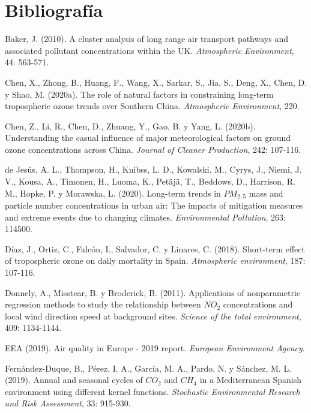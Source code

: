 \documentclass[12pt]{article}
\begin{document}
\section{Bibliografía}

\begin{thebibliography}{99}

 Baker, J. (2010). A cluster analysis of long range air transport pathways and associated pollutant concentrations within the UK. \textit{Atmospheric Environment}, 44: 563-571.

 Chen, X., Zhong, B., Huang, F., Wang, X., Sarkar, S., Jia, S., Deng, X., Chen, D. y Shao, M. (2020a). The role of natural factors in constraining long-term tropospheric ozone trends over Southern China. \textit{Atmospheric Environment}, 220.

 Chen, Z., Li, R., Chen, D., Zhuang, Y., Gao, B. y Yang, L. (2020b). Understanding the casual influence of major meteorological factors on ground ozone concentrations across China. \textit{Journal of Cleaner Production}, 242: 107-116.

 de Jesús, A. L., Thompson, H., Knibss, L. D., Kowalski, M., Cyrys, J., Niemi, J. V., Kousa, A., Timonen, H., Luoma, K., Petäjä, T., Beddows, D., Harrison, R. M., Hopke, P. y Morawska, L. (2020). Long-term trends in $PM_{2,5}$ mass and particle number concentrations in urban air: The impacts of mitigation measures and extreme events due to changing climates. \textit{Environmental Pollution}, 263: 114500.

 Díaz, J., Ortiz, C., Falcón, I., Salvador, C. y Linares, C. (2018). Short-term effect of tropospheric ozone on daily mortality in Spain. \textit{Atmospheric environment}, 187: 107-116.

 Donnely, A., Misstear, B. y Broderick, B. (2011). Applications of nonparametric regression methods to study the relationship between $NO_{2}$ concentrations and local wind direction speed at background sites. \textit{Science of the total environment}, 409: 1134-1144.

 EEA (2019). Air quality in Europe - 2019 report. \textit{European Environment Agency}.

 Fernández-Duque, B., Pérez, I. A., García, M. A., Pardo, N. y Sánchez, M. L. (2019). Annual and seasonal cycles of $CO_{2}$ and $CH_{4}$ in a Mediterranean Spanish environment using different kernel functions. \textit{Stochastic Environmental Research and Risk Assessment}, 33: 915-930.


\end{thebibliography}
\end{document}
